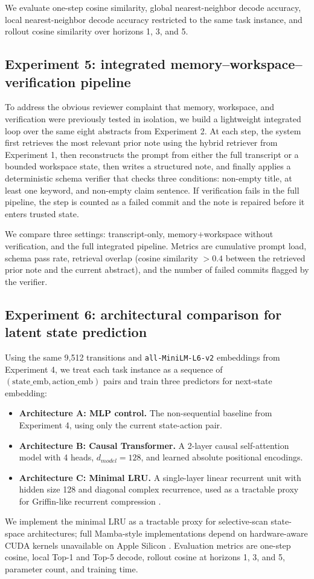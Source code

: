\documentclass[11pt]{article}
\begin{document}
We evaluate one-step cosine similarity, global nearest-neighbor decode accuracy, local nearest-neighbor decode accuracy restricted to the same task instance, and rollout cosine similarity over horizons 1, 3, and 5.

\subsection{Experiment 5: integrated memory--workspace--verification pipeline}
To address the obvious reviewer complaint that memory, workspace, and verification were previously tested in isolation, we build a lightweight integrated loop over the same eight abstracts from Experiment 2. At each step, the system first retrieves the most relevant prior note using the hybrid retriever from Experiment 1, then reconstructs the prompt from either the full transcript or a bounded workspace state, then writes a structured note, and finally applies a deterministic schema verifier that checks three conditions: non-empty title, at least one keyword, and non-empty claim sentence. If verification fails in the full pipeline, the step is counted as a failed commit and the note is repaired before it enters trusted state.

We compare three settings: transcript-only, memory+workspace without verification, and the full integrated pipeline. Metrics are cumulative prompt load, schema pass rate, retrieval overlap (cosine similarity $> 0.4$ between the retrieved prior note and the current abstract), and the number of failed commits flagged by the verifier.

\subsection{Experiment 6: architectural comparison for latent state prediction}
Using the same 9,512 transitions and \texttt{all-MiniLM-L6-v2} embeddings from Experiment 4, we treat each task instance as a sequence of $(\text{state\_emb}, \text{action\_emb})$ pairs and train three predictors for next-state embedding:
\begin{itemize}
    \item \textbf{Architecture A: MLP control.} The non-sequential baseline from Experiment 4, using only the current state-action pair.
    \item \textbf{Architecture B: Causal Transformer.} A 2-layer causal self-attention model with 4 heads, $d_{model}=128$, and learned absolute positional encodings.
    \item \textbf{Architecture C: Minimal LRU.} A single-layer linear recurrent unit with hidden size 128 and diagonal complex recurrence, used as a tractable proxy for Griffin-like recurrent compression \citep{griffin2024}.
\end{itemize}
We implement the minimal LRU as a tractable proxy for selective-scan state-space architectures; full Mamba-style implementations depend on hardware-aware CUDA kernels unavailable on Apple Silicon \citep{mamba2023}. Evaluation metrics are one-step cosine, local Top-1 and Top-5 decode, rollout cosine at horizons 1, 3, and 5, parameter count, and training time.
\end{document}
